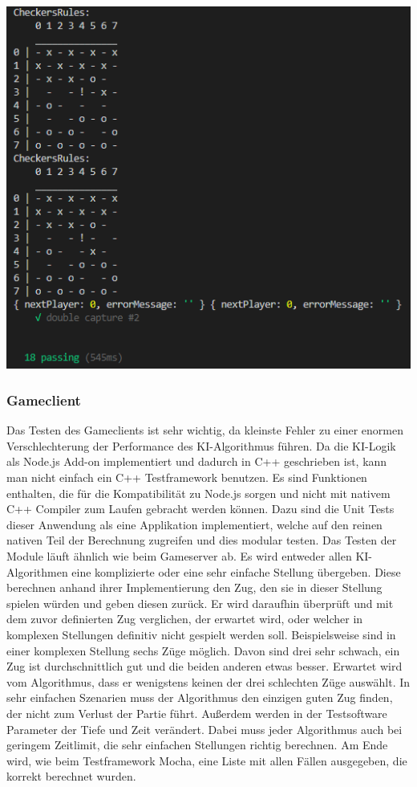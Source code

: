 \documentclass[12pt,a4paper,bibliography=totocnumbered,listof=totocnumbered]{article}
\begin{document}
\vspace{1em}
\begin{minipage}{\linewidth}
	\centering
	\includegraphics[width=0.6\linewidth]{pics/UnitTestResult.png}
	\label{fig:UnitTestResult}
\end{minipage}

\subsubsection{Gameclient}
Das Testen des Gameclients ist sehr wichtig, da kleinste Fehler zu einer enormen Verschlechterung der Performance des \ac{KI}-Algorithmus führen.
Da die \ac{KI}-Logik als Node.js Add-on implementiert und dadurch in C++ geschrieben ist, kann man nicht einfach ein C++ Testframework benutzen. 
Es sind Funktionen enthalten, die für die Kompatibilität zu Node.js sorgen und nicht mit nativem C++ Compiler zum Laufen gebracht werden können.
Dazu sind die Unit Tests dieser Anwendung als eine Applikation implementiert, welche auf den reinen nativen Teil der Berechnung zugreifen und 
dies modular testen. 
Das Testen der Module läuft ähnlich wie beim Gameserver ab. Es wird entweder allen \ac{KI}-Algorithmen eine komplizierte oder eine sehr einfache Stellung 
übergeben. Diese berechnen anhand ihrer Implementierung den Zug, den sie in dieser Stellung spielen würden und
geben diesen zurück. Er wird daraufhin überprüft und mit dem zuvor definierten Zug verglichen, der erwartet wird, oder welcher in 
komplexen Stellungen definitiv nicht gespielt werden soll. Beispielsweise sind in einer komplexen Stellung sechs Züge möglich. Davon sind drei sehr schwach,
ein Zug ist durchschnittlich gut und die beiden anderen etwas besser. Erwartet wird vom Algorithmus, dass er wenigstens keinen der drei schlechten Züge
auswählt. In sehr einfachen Szenarien muss der Algorithmus den einzigen guten Zug finden, der nicht zum Verlust der Partie führt. 
Außerdem werden in der Testsoftware Parameter der Tiefe und Zeit verändert. Dabei muss jeder Algorithmus auch bei geringem Zeitlimit, die sehr einfachen
Stellungen richtig berechnen. Am Ende wird, wie beim Testframework Mocha, eine Liste mit allen Fällen ausgegeben, die korrekt berechnet wurden.
\end{document}
